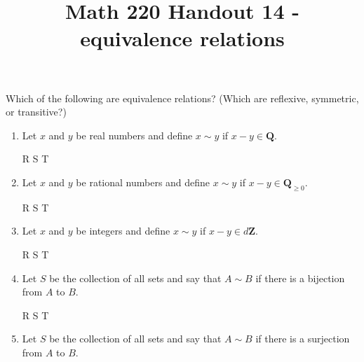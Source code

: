 \documentclass[12pt, reqno]{amsart}
\begin{document}
\title[Math 220 Handout 14  - equivalence relations]{Math 220 Handout
  14  - equivalence relations}\maketitle


Which of the following are equivalence relations? (Which are
  reflexive, symmetric, or transitive?)
\begin{enumerate}



\item  Let $x$ and $y$ be real numbers and define $x \sim y$ if $x -
  y \in \mathbf{Q}$.


\vspace{.4cm}
  \hspace{.4cm} R \hspace{.4cm} S \hspace{.4cm} T
\vspace{.9cm}

\item Let $x$ and $y$ be rational numbers and define $x \sim y$ if $x -
  y \in \mathbf{Q}_{\geq 0}$.


\vspace{.4cm}
  \hspace{.4cm} R \hspace{.4cm} S \hspace{.4cm} T
\vspace{.9cm}

\item   Let $x$ and $y$ be integers and define $x \sim y$ if $x -
  y \in d\mathbf{Z}$. 

\vspace{.4cm}
  \hspace{.4cm} R \hspace{.4cm} S \hspace{.4cm} T
\vspace{.9cm}
  
  \item Let $S$ be the collection of all sets and say that $A \sim
  B$ if there is a bijection from $A$ to $B$.

\vspace{.4cm}
  \hspace{.4cm} R \hspace{.4cm} S \hspace{.4cm} T
\vspace{.9cm}

\item Let $S$ be the collection of all sets and say that $A \sim
  B$ if there is a surjection from $A$ to $B$.


\end{enumerate}
\end{document}
